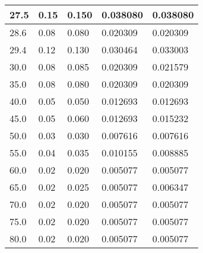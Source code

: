 \begin{longtable}{|p{3cm}|p{3cm}|p{3cm}|p{3cm}|p{3cm}|}
    27.5     & 0.15                  & 0.150                 & 0.038080                                                 & 0.038080                                                 \\\hline
    28.6     & 0.08                  & 0.080                 & 0.020309                                                 & 0.020309                                                 \\\hline
    29.4     & 0.12                  & 0.130                 & 0.030464                                                 & 0.033003                                                 \\\hline
    30.0     & 0.08                  & 0.085                 & 0.020309                                                 & 0.021579                                                 \\\hline
    35.0     & 0.08                  & 0.080                 & 0.020309                                                 & 0.020309                                                 \\\hline
    40.0     & 0.05                  & 0.050                 & 0.012693                                                 & 0.012693                                                 \\\hline
    45.0     & 0.05                  & 0.060                 & 0.012693                                                 & 0.015232                                                 \\\hline
    50.0     & 0.03                  & 0.030                 & 0.007616                                                 & 0.007616                                                 \\\hline
    55.0     & 0.04                  & 0.035                 & 0.010155                                                 & 0.008885                                                 \\\hline
    60.0     & 0.02                  & 0.020                 & 0.005077                                                 & 0.005077                                                 \\\hline
    65.0     & 0.02                  & 0.025                 & 0.005077                                                 & 0.006347                                                 \\\hline
    70.0     & 0.02                  & 0.020                 & 0.005077                                                 & 0.005077                                                 \\\hline
    75.0     & 0.02                  & 0.020                 & 0.005077                                                 & 0.005077                                                 \\\hline
    80.0     & 0.02                  & 0.020                 & 0.005077                                                 & 0.005077                                                 \\\hline
\end{longtable}

